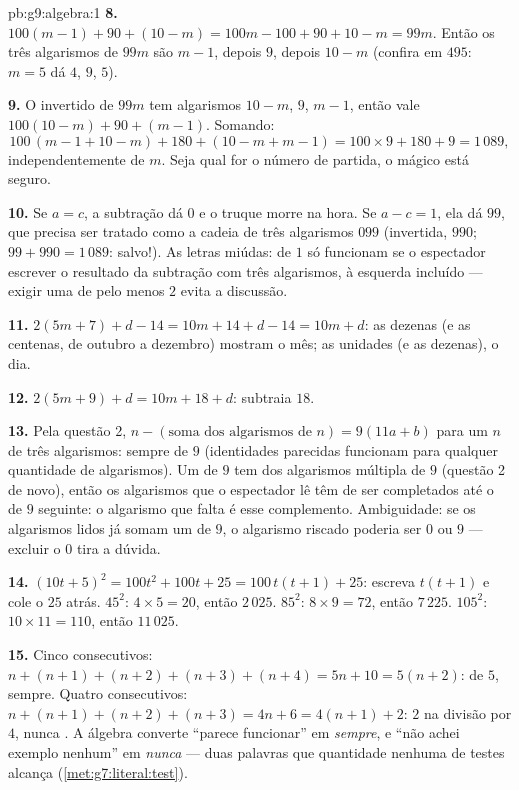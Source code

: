 \begin{solution}{pb:g9:algebra:1}
\textbf{8.} $100(m - 1) + 90 + (10 - m) = 100m - 100 + 90 + 10 - m
= 99m$. Então os três algarismos de $99m$ são $m - 1$, depois $9$,
depois $10 - m$ (confira em $495$: $m = 5$ dá $4$, $9$, $5$).

\textbf{9.} O invertido de $99m$ tem algarismos $10 - m$, $9$,
$m - 1$, então vale $100(10 - m) + 90 + (m - 1)$. Somando:
\[
100\,(m - 1 + 10 - m) + 180 + (10 - m + m - 1)
= 100 \times 9 + 180 + 9 = 1\,089 ,
\]
independentemente de $m$. Seja qual for o número de partida, o mágico
está seguro.

\textbf{10.} Se $a = c$, a subtração dá $0$ e o truque morre na hora.
Se $a - c = 1$, ela dá $99$, que precisa ser tratado como a cadeia de
três algarismos $099$ (invertida, $990$; $99 + 990 = 1\,089$: salvo!).
As letras miúdas:  de $1$ só funcionam se o espectador
escrever o resultado da subtração com três algarismos,  à esquerda
incluído --- exigir uma  de pelo menos $2$ evita a discussão.

\textbf{11.} $2(5m + 7) + d - 14 = 10m + 14 + d - 14 = 10m + d$: as
dezenas (e as centenas, de outubro a dezembro) mostram o mês; as
unidades (e as dezenas), o dia.

\textbf{12.} $2(5m + 9) + d = 10m + 18 + d$: subtraia $18$.

\textbf{13.} Pela questão 2,
$n - (\text{soma dos algarismos de } n) = 9(11a + b)$ para um $n$ de
três algarismos: sempre  de $9$ (identidades parecidas
funcionam para qualquer quantidade de algarismos). Um  de $9$
tem  dos algarismos múltipla de $9$ (questão 2 de novo), então os
algarismos que o espectador lê têm de ser completados até o  de
$9$ seguinte: o algarismo que falta é esse complemento. Ambiguidade: se
os algarismos lidos já somam um  de $9$, o algarismo riscado
poderia ser $0$ ou $9$ --- excluir o $0$ tira a dúvida.

\textbf{14.} $(10t + 5)^2 = 100t^2 + 100t + 25 = 100\,t(t + 1) + 25$:
escreva $t(t+1)$ e cole o $25$ atrás. $45^2$: $4 \times 5 = 20$, então
$2\,025$. $85^2$: $8 \times 9 = 72$, então $7\,225$. $105^2$:
$10 \times 11 = 110$, então $11\,025$.

\textbf{15.} Cinco consecutivos:
$n + (n+1) + (n+2) + (n+3) + (n+4) = 5n + 10 = 5(n + 2)$:  de
$5$, sempre. Quatro consecutivos:
$n + (n+1) + (n+2) + (n+3) = 4n + 6 = 4(n + 1) + 2$:  $2$ na
divisão por $4$, nunca . A álgebra converte ``parece
funcionar'' em \emph{sempre}, e ``não achei exemplo nenhum'' em
\emph{nunca} --- duas palavras que quantidade nenhuma de testes alcança
(\cref{met:g7:literal:test}).
\end{solution}
